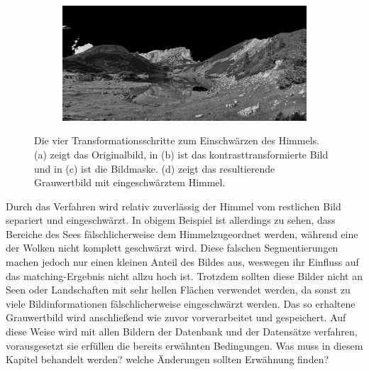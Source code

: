 \documentclass[12pt,a4paper,titlepage]{scrartcl}
\begin{document}
\begin{figure}[h!]
\begin{subfigure}[c]{0.49\textwidth}
\label{simg:Alle_Mask}
\end{subfigure}
%
\begin{subfigure}[c]{0.49\textwidth}
\includegraphics[width=\textwidth]{../Bilder/Sky_Blackening_ThirdStep.jpg}
\label{simg:Alle_sky_black}
\end{subfigure}
\caption[Kontrasttransformation für sky blackening]{Die vier Transformationsschritte zum Einschwärzen des Himmels. (a) zeigt das Originalbild, in (b) ist das kontrasttransformierte Bild und in (c) ist die Bildmaske. (d) zeigt das resultierende Grauwertbild mit eingeschwärztem Himmel.}\label{img:Alle_Trans}
\end{figure} 
Durch das Verfahren wird relativ zuverlässig der Himmel vom restlichen Bild separiert und eingeschwärzt. In obigem Beispiel ist allerdings zu sehen, dass Bereiche des Sees fälschlicherweise dem Himmelzugeordnet werden, während eine der Wolken nicht komplett geschwärzt wird. Diese falschen Segmentierungen machen jedoch nur einen kleinen Anteil des Bildes aus, weswegen ihr Einfluss auf das matching-Ergebnis nicht allzu hoch ist. Trotzdem sollten diese Bilder nicht an Seen oder Landschaften mit sehr hellen Flächen verwendet werden, da sonst zu viele Bildinformationen fälschlicherweise eingeschwärzt werden. Das so erhaltene Grauwertbild wird anschließend wie zuvor vorverarbeitet und gespeichert. Auf diese Weise wird mit allen Bildern der Datenbank und der Datensätze verfahren, vorausgesetzt sie erfüllen die bereits erwähnten Bedingungen. 
\newpage
Was muss in diesem Kapitel behandelt werden? welche Änderungen sollten Erwähnung finden?
\end{document}
